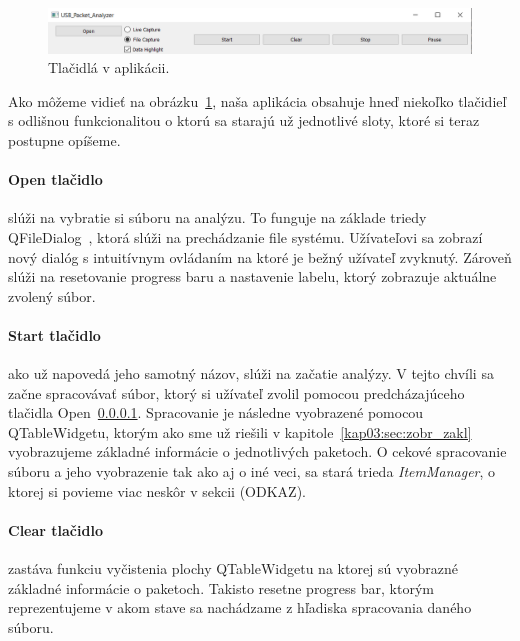 \begin{figure}[!htb]
	\centering
	\includegraphics[width=\textwidth]{img/kap04_arch_buttons}
	\caption{Tlačidlá v aplikácii.}
	\label{obr:kap4:arch:buttons}
\end{figure}

Ako môžeme vidieť na obrázku~\ref{obr:kap4:arch:buttons}, naša aplikácia obsahuje hneď niekoľko tlačidieľ s odlišnou funkcionalitou o ktorú sa starajú už jednotlivé sloty, ktoré si teraz postupne opíšeme.

\paragraph{Open tlačidlo}
\label{kap04:sec:open_button}

slúži na vybratie si súboru na analýzu. To funguje na základe triedy QFileDialog~\cite{qfiledialog}, ktorá slúži na prechádzanie file systému. Užívateľovi sa zobrazí nový dialóg s intuitívnym ovládaním na ktoré je bežný užívateľ zvyknutý. Zároveň slúži na resetovanie progress baru a nastavenie labelu, ktorý zobrazuje aktuálne zvolený súbor.

\paragraph{Start tlačidlo}

ako už napovedá jeho samotný názov, slúži na začatie analýzy. V tejto chvíli sa začne spracovávať súbor, ktorý si užívateľ zvolil pomocou predcházajúceho tlačidla Open~\ref{kap04:sec:open_button}. Spracovanie je následne vyobrazené pomocou QTableWidgetu, ktorým ako sme už riešili v kapitole~\ref{kap03:sec:zobr_zakl} vyobrazujeme základné informácie o jednotlivých paketoch. O cekové spracovanie súboru a jeho vyobrazenie tak ako aj o iné veci, sa stará trieda \textit{ItemManager}, o ktorej si povieme viac neskôr v sekcii (ODKAZ).

\paragraph{Clear tlačidlo}

zastáva funkciu vyčistenia plochy QTableWidgetu na ktorej sú vyobrazné základné informácie o paketoch. Takisto resetne progress bar, ktorým reprezentujeme v akom stave sa nachádzame z hľadiska spracovania daného súboru.

